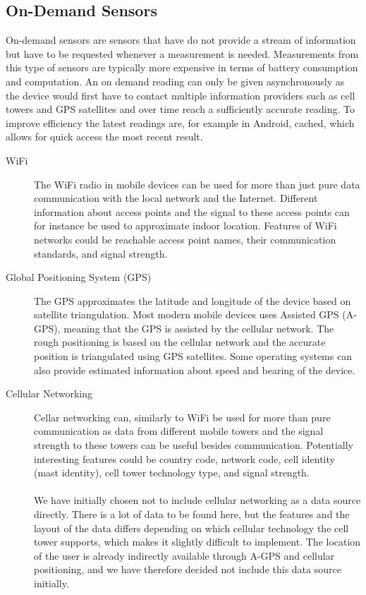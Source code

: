 \subsection{On-Demand Sensors}
On-demand sensors are sensors that have do not provide a stream of information but have to be requested whenever a measurement is needed. Measurements from this type of sensors are typically more expensive in terms of battery consumption and computation. An on demand reading can only be given asynchronously as the device would first have to contact multiple information providers such as cell towers and GPS satellites and over time reach a sufficiently accurate reading. To improve efficiency the latest readings are, for example in Android, cached, which allows for quick access the most recent result.

\begin{description}
    \item[WiFi] The WiFi radio in mobile devices can be used for more than just pure data communication with the local network and the Internet. Different information about access points and the signal to these access points can for instance be used to approximate indoor location. Features of WiFi networks could be reachable access point names, their communication standards, and signal strength. 
    \item[Global Positioning System (GPS)] The GPS approximates the latitude and longitude of the device based on satellite triangulation. Most modern mobile devices uses Assisted GPS (A-GPS), meaning that the GPS is assisted by the cellular network. The rough positioning is based on the cellular network and the accurate position is triangulated using GPS satellites. Some operating systems can also provide estimated information about speed and bearing of the device.
    \item[Cellular Networking] Cellar networking can, similarly to WiFi be used for more than pure communication as data from different mobile towers and the signal strength to these towers can be useful besides communication. Potentially interesting features could be country code, network code, cell identity (mast identity), cell tower technology type, and signal strength.
    \\\\
    We have initially chosen not to include cellular networking as a data source directly. There is a lot of data to be found here, but the features and the layout of the data differs depending on which cellular technology the cell tower supports, which makes it slightly difficult to implement. The location of the user is already indirectly available through A-GPS and cellular positioning, and we have therefore decided not include this data source initially. 
\end{description}



